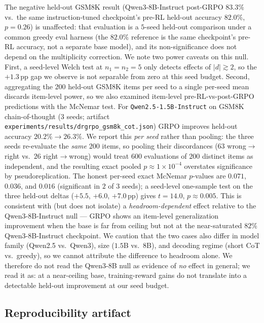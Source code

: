 The negative held-out GSM8K result (Qwen3-8B-Instruct post-GRPO $83.3\%$ vs.\
the same instruction-tuned checkpoint's pre-RL held-out accuracy $82.0\%$,
$p{=}0.26$) is unaffected: that evaluation is a $5$-seed held-out comparison
under a common greedy eval harness (the $82.0\%$ reference is the same
checkpoint's pre-RL accuracy, not a separate base model), and its
non-significance does not depend on the multiplicity correction. We note two
power caveats on this null. First, a seed-level Welch test at $n_1{=}n_2{=}5$
only detects effects of $|d|\gtrsim 2$, so the $+1.3$\,pp gap we observe is not
separable from zero at this seed budget. Second, aggregating the $200$ held-out GSM8K
items per seed to a single per-seed mean discards item-level power, so we also
examined item-level pre-RL-vs-post-GRPO predictions with the McNemar test. For
\texttt{Qwen2.5-1.5B-Instruct} on GSM8K chain-of-thought ($3$ seeds; artifact
\texttt{experiments/results/drgrpo\_gsm8k\_cot.json}) GRPO improves held-out
accuracy $20.2\% \to 26.3\%$. We report this \emph{per seed} rather than pooling:
the three seeds re-evaluate the \emph{same} $200$ items, so pooling their
discordances ($63$ wrong$\to$right vs.\ $26$ right$\to$wrong) would treat $600$
evaluations of $200$ distinct items as independent, and the resulting exact
pooled $p \approx 1\times10^{-4}$ overstates significance by pseudoreplication.
The honest per-seed exact McNemar $p$-values are $0.071$, $0.036$, and $0.016$
(significant in $2$ of $3$ seeds); a seed-level one-sample test on the three
held-out deltas ($+5.5$, $+6.0$, $+7.0$\,pp) gives $t{=}14.0$, $p\approx0.005$.
This is consistent with (but does not isolate) a \emph{headroom-dependent}
effect relative to the Qwen3-8B-Instruct null --- GRPO shows an item-level
generalization improvement when the base is far from ceiling but not at the
near-saturated $82\%$ Qwen3-8B-Instruct checkpoint. We caution that the two cases
also differ in model family (Qwen2.5 vs.\ Qwen3), size ($1.5$B vs.\ $8$B), and
decoding regime (short CoT vs.\ greedy), so we cannot attribute the difference to
headroom alone. We therefore do not read the Qwen3-8B null
as evidence of \emph{no} effect in general; we read it as: at a near-ceiling
base, training-reward gains do not translate into a detectable held-out
improvement at our seed budget.

\subsection{Reproducibility artifact}
\label{sec:stat-rigor-addendum:repro}

